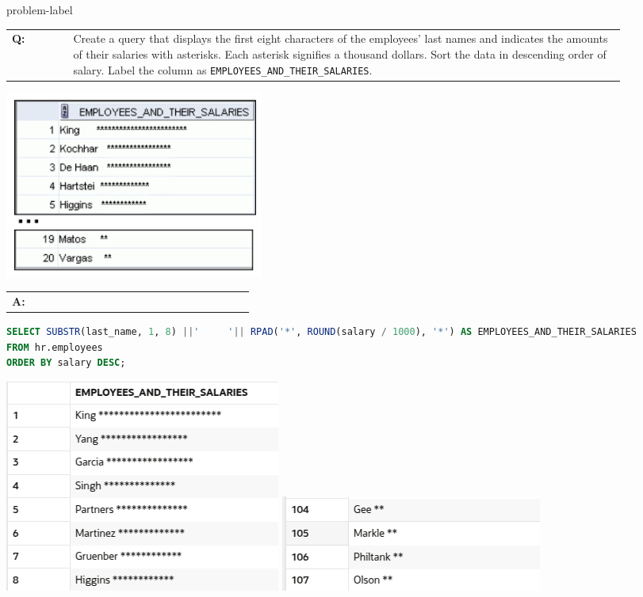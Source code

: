 \begin{problem}{}{problem-label}

\begin{tabular}{@{}l p{0.9\linewidth}@{}}
  \textbf{Q:} & Create a query that displays the first eight characters of the employees’ last names and indicates
the amounts of their salaries with asterisks. Each asterisk signifies a thousand dollars. Sort the data in descending order of salary. Label the column as
\texttt{EMPLOYEES\_AND\_THEIR\_SALARIES}.
\end{tabular}

\begin{center}
  \includegraphics[scale=0.8]{images/c3q8.png}
\end{center}

\begin{tabular}{@{}l p{0.9\linewidth}@{}}
  \textbf{A:} & 
\end{tabular}


\begin{lstlisting}[language=SQL]
SELECT SUBSTR(last_name, 1, 8) ||'     '|| RPAD('*', ROUND(salary / 1000), '*') AS EMPLOYEES_AND_THEIR_SALARIES
FROM hr.employees
ORDER BY salary DESC;
\end{lstlisting}

\vspace{1em}

\begin{center}
  \includegraphics[scale=0.7]{images/c3a8-01.png}
  \includegraphics[scale=0.8]{images/c3a8-2.png}
\end{center}


\end{problem}
